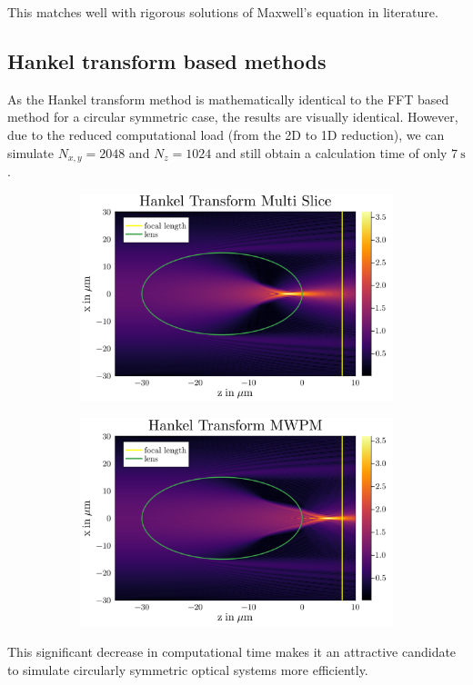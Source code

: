 \documentclass[a4paper,12pt]{article}
\begin{document}
This matches well with rigorous solutions of Maxwell's equation in literature. 

\subsection{Hankel transform based methods}
As the Hankel transform method is mathematically identical to the FFT based method for a circular symmetric case, the results are visually identical.
However, due to the reduced computational load (from the 2D to 1D reduction), we can simulate $N_{x,y} = 2048$ and $N_z=1024$ and still obtain a calculation time of only $\SI{7}{\second}$. 
\begin{figure}[H]
    \centering
    \begin{subfigure}[]{0.5\textwidth}
        \centering
        \includegraphics[width=\textwidth]{../figures/Hankel_normal.svg.png} 
    \end{subfigure}%
    \begin{subfigure}[]{0.5\textwidth}
        \centering
        \includegraphics[width=\textwidth]{../figures/Hankel_MWPM.svg.png} 
    \end{subfigure}
    \caption{}
    \label{fig:}
\end{figure}
This significant decrease in computational time makes it an attractive candidate
to simulate circularly symmetric optical systems more efficiently.
\end{document}
